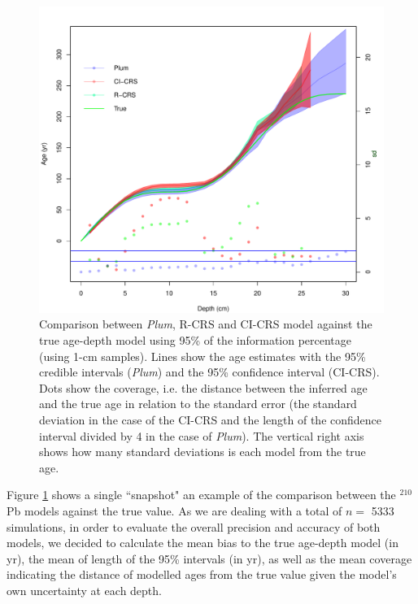 \documentclass [10pt] {article}
\begin{document}
\begin{figure}[!]
	\centering
	\includegraphics[width=\linewidth]{95Comparison.pdf}
		\caption{Comparison between \textit{Plum}, R-CRS and CI-CRS model against the true age-depth model using 95\% of the information percentage (using 1-cm samples). Lines show the age estimates with the 95\% credible intervals (\textit{Plum}) and the 95\% confidence interval (CI-CRS). Dots show the coverage, i.e. the distance between the inferred age and the true age in relation to the standard error (the standard deviation in the case of the CI-CRS and the length of the confidence interval divided by 4 in the case of \textit{Plum}). The vertical right axis shows how many standard deviations is each model from the true age.  }
		\label{fig:comparison1r}
\end{figure}

Figure \ref{fig:comparison1r} shows a single ``snapshot" an example of the comparison between the $^{210}$Pb models against the true value. 
As we are dealing with a total of $n =$ 5333 simulations, in order to evaluate the overall precision and accuracy of both models, we decided to calculate the mean bias to the true age-depth model (in yr), the mean of length of the 95\% intervals (in yr), as well as the mean coverage indicating the distance of modelled ages from the true value given the model's own uncertainty at each depth.  
\end{document}
